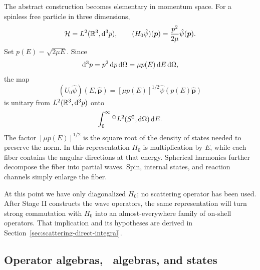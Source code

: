 The abstract construction becomes elementary in momentum space.  For a
spinless free particle in three dimensions,
\begin{equation}
  \mathcal{H}=L^2(\mathbb{R}^3,\mathrm{d}^3p),
  \qquad
  (H_0\hat\psi)(\bm p)=\frac{p^2}{2\mu}\hat\psi(\bm p) .
  \label{eq:free-H-momentum}
\end{equation}
Set $p(E)=\sqrt{2\mu E}$.  Since
\begin{equation}
  \mathrm{d}^3p=p^2\,\mathrm{d} p\,\mathrm{d}\Omega
  =\mu p(E)\,\mathrm{d} E\,\mathrm{d}\Omega,
  \label{eq:free-energy-measure}
\end{equation}
the map
\begin{equation}
  (U_0\hat\psi)(E,\hat{\bm p})
  =[\mu p(E)]^{1/2}
  \hat\psi(p(E)\hat{\bm p})
  \label{eq:free-energy-unitary}
\end{equation}
is unitary from $L^2(\mathbb{R}^3,\mathrm{d}^3p)$ onto
\begin{equation}
  \int_0^\infty{}^\oplus
  L^2(S^2,\mathrm{d}\Omega)\,\mathrm{d} E .
  \label{eq:free-particle-direct-integral}
\end{equation}
The factor $[\mu p(E)]^{1/2}$ is the square root of the density of states
needed to preserve the norm.  In this representation $H_0$ is multiplication
by $E$, while each fiber contains the angular directions at that energy.
Spherical harmonics further decompose the fiber into partial waves.  Spin,
internal states, and reaction channels simply enlarge the fiber.

At this point we have only diagonalized $H_0$; no scattering operator has
been used.  After Stage II constructs the wave operators, the same
representation will turn strong commutation with $H_0$ into an
almost-everywhere family of on-shell operators.  That implication and its
hypotheses are derived in Section~\ref{sec:scattering-direct-integral}.

\subsection{Operator algebras, \vN\ algebras, and states}
\label{subsec:cstar-von-neumann}

